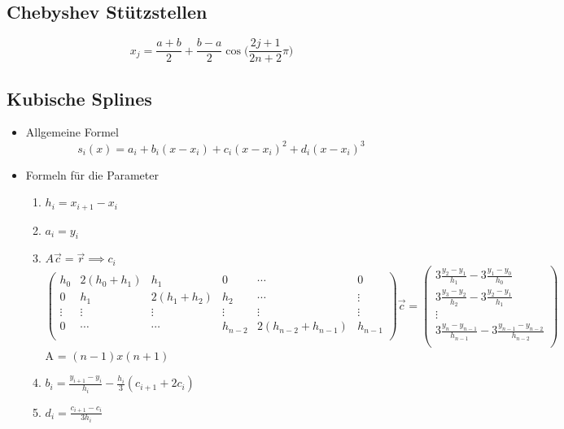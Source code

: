 \subsection{Chebyshev Stützstellen}

\begin{equation*}
	x_j = \frac{a+b}{2} + \frac{b-a}{2} \cos\bigg(\frac{2j + 1}{2n + 2} \pi\bigg)
\end{equation*}

\subsection{Kubische Splines}

\begin{itemize}
	
	\item Allgemeine Formel \\
	\begin{equation*}
		s_i(x) = a_i + b_i (x - x_i) + c_i (x - x_i)^2 + d_i (x - x_i)^3
	\end{equation*}
	
	\item Formeln für die Parameter \\
	\begin{enumerate}
		\item $h_i = x_{i+1} - x_i$
		\item $a_i = y_i$
		\item $A\vec{c}=\vec{r} \implies c_i$
		\begin{displaymath}
			\begin{pmatrix}
				h_0		& 2(h_0 + h_1)	& h_1	& 0 		& \cdots	& 0 \\
				0		& h_1	& 2(h_1 + h_2)	& h_2		& \cdots	& \vdots \\
				\vdots	& \vdots	& \vdots	& \vdots	& \vdots	& \vdots \\
				0		& \cdots	& \cdots	& h_{n-2}	& 2(h_{n-2} + h_{n-1})	& h_{n-1} \\
			\end{pmatrix}
			\vec{c} = 
			\begin{pmatrix}
				3\frac{y_2-y_1}{h_1} - 3\frac{y_1-y_0}{h_0} \\
				3\frac{y_3-y_2}{h_2} - 3\frac{y_2-y_1}{h_1} \\
				\vdots \\
				3\frac{y_n-y_{n-1}}{h_{n-1}} - 3\frac{y_{n-1}-y_{n-2}}{h_{n-2}} \\
			\end{pmatrix}
		\end{displaymath}
		A = $(n-1) x (n+1)$
		\item $b_i = \frac{y_{i+1} - y_i}{h_i} - \frac{h_i}{3} (c_{i+1} + 2c_i)$
		\item $d_i = \frac{c_{i+1} - c_i}{3 h_i}$
	\end{enumerate}
	

\end{itemize}
